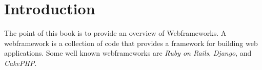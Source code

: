 \chapter{Introduction}

The point of this book is to provide an overview of Webframeworks. A
webframework is a collection of code that provides a framework for
building web applications. Some well known webframeworks are \emph{Ruby
on Rails}, \emph{Django}, and \emph{CakePHP}.
